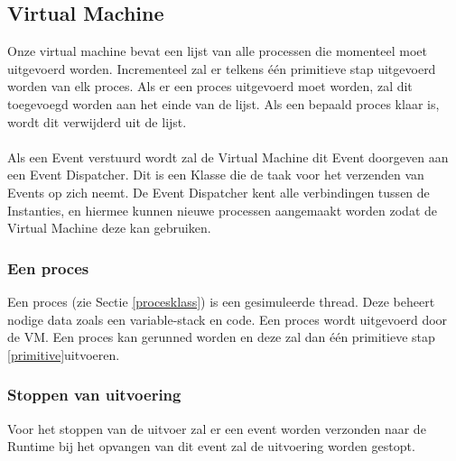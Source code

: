 \documentclass[]{article}
\begin{document}
\subsection{Virtual Machine}
\label{VM}
Onze virtual machine bevat een lijst van alle processen die momenteel moet uitgevoerd worden. Incrementeel zal er telkens \'{e}\'{e}n  primitieve stap uitgevoerd worden van elk proces. Als er een proces uitgevoerd moet worden, zal dit toegevoegd worden aan het einde van de lijst. Als een bepaald proces klaar is, wordt dit verwijderd uit de lijst. \\\\
Als een Event verstuurd wordt zal de Virtual Machine dit Event doorgeven aan een Event Dispatcher. Dit is een Klasse die de taak voor het verzenden van Events op zich neemt. De Event Dispatcher kent alle verbindingen tussen de Instanties, en hiermee kunnen nieuwe processen aangemaakt worden zodat de Virtual Machine deze kan gebruiken. 
\subsubsection{Een proces}
Een proces (zie Sectie \ref{procesklass}) is een gesimuleerde thread. Deze beheert nodige data zoals een variable-stack en code. Een proces wordt uitgevoerd door de VM. Een proces kan gerunned worden en deze zal dan \'{e}\'{e}n primitieve stap \ref{primitive}uitvoeren.
\subsubsection{Stoppen van uitvoering}
Voor het stoppen van de uitvoer zal er een event worden verzonden naar de Runtime bij het opvangen van dit event zal de uitvoering worden gestopt.
\end{document}
